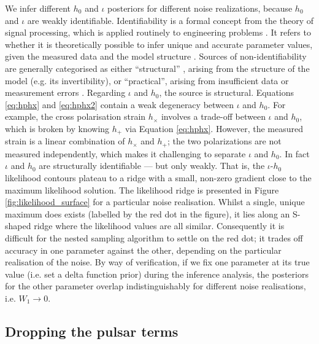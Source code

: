 \documentclass[fleqn,usenatbib,useAMS]{mnras}
\begin{document}
We infer different $h_0$ and $\iota$ posteriors for different noise realizations, because $h_0$ and $\iota$ are weakly identifiable. Identifiability is a formal concept from the theory of signal processing, which is applied routinely to engineering problems \citep{e5be7c83a0d24500826f6e1b414d1733}. It refers to whether it is theoretically possible to infer unique and accurate parameter values, given the measured data and the model structure . Sources of non-identifiability are generally categorised as either ``structural'' , arising from the structure of the model (e.g. its invertibility), or ``practical'', arising from insufficient data or measurement errors \citep{GUILLAUME2019418}. Regarding $\iota$ and $h_0$, the source is structural. Equations \eqref{eq:hphx} and \eqref{eq:hphx2} contain a weak degeneracy between $\iota$ and $h_0$. For example, the cross polarisation strain $h_{\times}$ involves a trade-off between $\iota$ and $h_0$, which is broken by knowing $h_+$ via Equation \eqref{eq:hphx}. However, the measured strain is a linear combination of $h_\times$ and $h_+$; the two polarizations are not measured independently, which makes it challenging to separate $\iota$ and $h_0$. In fact $\iota$ and $h_0$ are structurally identifiable --- but only weakly. That is, the $\iota$-$h_0$ likelihood contours plateau to a ridge with a small, non-zero gradient close to the maximum likelihood solution. The likelihood ridge is presented in Figure \ref{fig:likelihood_surface} for a particular noise realisation. Whilst a single, unique maximum does exists (labelled by the red dot in the figure), it lies along an S-shaped ridge where the likelihood values are all similar. Consequently it is difficult for the nested sampling algorithm to settle on the red dot; it trades off accuracy in one parameter against the other, depending on the particular realisation of the noise. By way of verification, if we fix one parameter at its true value (i.e. set a delta function prior) during the inference analysis, the posteriors for the other parameter overlap indistinguishably  for different noise realisations, i.e. $W_1 \to 0$. 


\subsection{Dropping the pulsar terms}\label{sec:pulsar_terms_drop}
\end{document}
